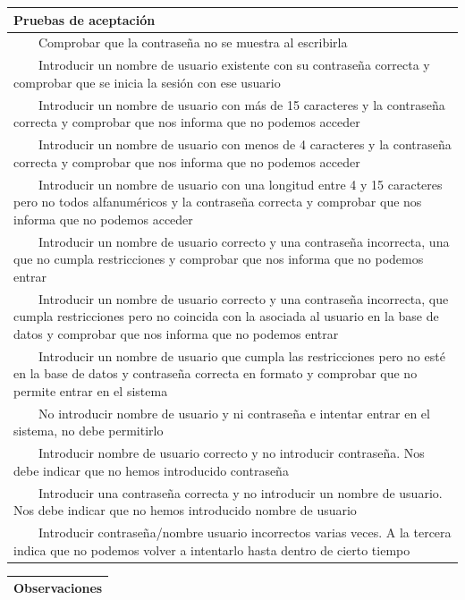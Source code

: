 \documentclass[11pt]{article}
\newcommand{\tabitem}{~~\llap{\textbullet}~~}
\begin{document}
  \begin{longtable}{p{1.028\linewidth}}
    \textbf{Pruebas de aceptación}\\
  \midrule
  \tabitem Comprobar que la contraseña no se muestra al escribirla\\
  \tabitem Introducir un nombre de usuario existente con su contraseña correcta y comprobar que se inicia la sesión con ese usuario\\
  \tabitem Introducir un nombre de usuario con más de 15 caracteres y la contraseña correcta y comprobar que nos informa que no podemos acceder\\
  \tabitem Introducir un nombre de usuario con menos de 4 caracteres y la contraseña correcta y comprobar que nos informa que no podemos acceder\\
  \tabitem Introducir un nombre de usuario con una longitud entre 4 y 15 caracteres pero no todos alfanuméricos y la contraseña correcta y comprobar que nos informa que no podemos acceder\\
  \tabitem Introducir un nombre de usuario correcto y una contraseña incorrecta, una que no cumpla restricciones y comprobar que nos informa que no podemos entrar\\
  \tabitem Introducir un nombre de usuario correcto y una contraseña incorrecta, que cumpla restricciones pero no coincida con la asociada al usuario en la base de datos y comprobar que nos informa que no podemos entrar\\
  \tabitem Introducir un nombre de usuario que cumpla las restricciones pero no esté en la base de datos y contraseña correcta en formato y comprobar que no permite entrar en el sistema\\
  \tabitem No introducir nombre de usuario y ni contraseña e intentar entrar en el sistema, no debe permitirlo\\
  \tabitem Introducir nombre de usuario correcto y no introducir contraseña. Nos debe indicar que no hemos introducido contraseña\\
  \tabitem Introducir una contraseña correcta y no introducir un nombre de usuario. Nos debe indicar que no hemos introducido nombre de usuario\\
  \tabitem Introducir contraseña/nombre usuario incorrectos varias veces. A la tercera indica que no podemos volver a intentarlo hasta dentro de cierto tiempo\\
\end{longtable}
\begin{longtable}{p{1.028\linewidth}}
  \textbf{Observaciones}\\
  \midrule
  \bottomrule
  \bottomrule
\end{longtable}
\end{document}
